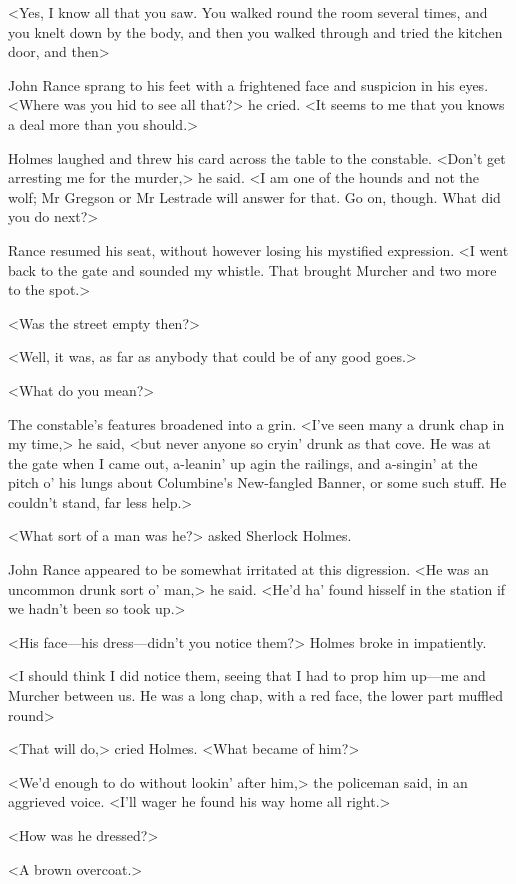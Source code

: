 <Yes, I know all that you saw. You walked round the room several times, and you knelt down by the body, and then you walked through and tried the kitchen door, and then\longdash>

John Rance sprang to his feet with a frightened face and suspicion in his eyes. <Where was you hid to see all that?> he cried. <It seems to me that you knows a deal more than you should.>

Holmes laughed and threw his card across the table to the constable. <Don't get arresting me for the murder,> he said. <I am one of the hounds and not the wolf; Mr Gregson or Mr Lestrade will answer for that. Go on, though. What did you do next?>

Rance resumed his seat, without however losing his mystified expression. <I went back to the gate and sounded my whistle. That brought Murcher and two more to the spot.>

<Was the street empty then?>

<Well, it was, as far as anybody that could be of any good goes.>

<What do you mean?>

The constable's features broadened into a grin. <I've seen many a drunk chap in my time,> he said, <but never anyone so cryin' drunk as that cove. He was at the gate when I came out, a-leanin' up agin the railings, and a-singin' at the pitch o' his lungs about Columbine's New-fangled Banner, or some such stuff. He couldn't stand, far less help.>

<What sort of a man was he?> asked Sherlock Holmes.

John Rance appeared to be somewhat irritated at this digression. <He was an uncommon drunk sort o' man,> he said. <He'd ha' found hisself in the station if we hadn't been so took up.>

<His face—his dress—didn't you notice them?> Holmes broke in impatiently.

<I should think I did notice them, seeing that I had to prop him up—me and Murcher between us. He was a long chap, with a red face, the lower part muffled round\longdash>

<That will do,> cried Holmes. <What became of him?>

<We'd enough to do without lookin' after him,> the policeman said, in an aggrieved voice. <I'll wager he found his way home all right.>

<How was he dressed?>

<A brown overcoat.>

